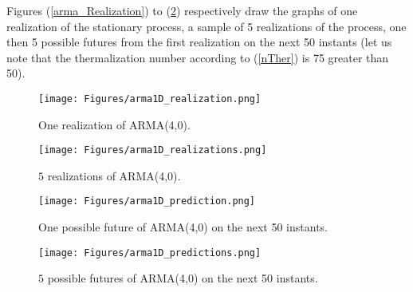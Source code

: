 Figures (\ref{arma_Realization}) to (\ref{arma_Predictions}) respectively draw the graphs of one realization of the stationary process, a sample of 5 realizations of the process, one then 5  possible futures from the first realization on the next 50 instants (let us note that the thermalization number according to (\ref{nTher}) is 75 greater than 50).


\begin{figure}[H]
  \begin{minipage}{9cm}
    \begin{center}
      \texttt{[image: Figures/arma1D\_realization.png]}
      \caption{One realization of ARMA(4,0).}
      \label{arma_Realization}
    \end{center}
  \end{minipage}
  \hfill
  \begin{minipage}{9cm}
    \begin{center}
      \texttt{[image: Figures/arma1D\_realizations.png]}
      \caption{$5$ realizations of ARMA(4,0).}
      \label{arma_Realizations}
    \end{center}
  \end{minipage}
\end{figure}


\begin{figure}[H]
  \begin{minipage}{9cm}
    \begin{center}
      \texttt{[image: Figures/arma1D\_prediction.png]}
      \caption{One possible future of ARMA(4,0) on the next 50 instants.}
      \label{arma_Prediction}
    \end{center}
  \end{minipage}
  \hfill
  \begin{minipage}{9cm}
    \begin{center}
      \texttt{[image: Figures/arma1D\_predictions.png]}
      \caption{$5$ possible futures of ARMA(4,0) on the next 50 instants.}
      \label{arma_Predictions}
    \end{center}
  \end{minipage}
\end{figure}
